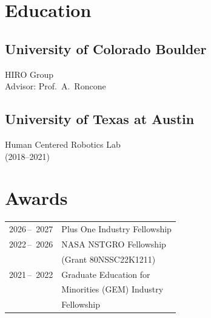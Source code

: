 \documentclass[]{deedy-resume-openfont}
\renewcommand{\sectionsep}{\vspace{3pt}}
\begin{document}
\begin{minipage}[t]{0.33\textwidth}
\section{Education}

\subsection{University of Colorado Boulder}
HIRO Group \\
Advisor: Prof.\ A.\ Roncone
\sectionsep

\subsection{University of Texas at Austin}
Human Centered Robotics Lab \\
(2018–2021)
\sectionsep

\section{Awards}
\begin{tabular}{rl}
2026\,–\ 2027 & Plus One Industry Fellowship \\
2022\,–\ 2026 & NASA NSTGRO Fellowship \\
           & (Grant 80NSSC22K1211) \\
2021\,–\ 2022 & Graduate Education for \\
           & Minorities (GEM) Industry \\
           & Fellowship \\
\end{tabular}
\sectionsep

\end{minipage}
\hfill
\end{document}
